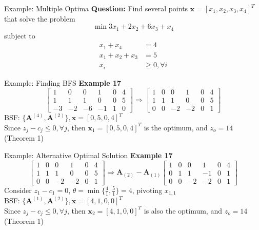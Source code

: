 \documentclass[aspectratio=169,hyperref,UTF8,CJK]{beamer}
\begin{document}
\begin{frame}{Example: Multiple Optima}
\textbf{Question:} Find several points \(\mathbf{x} = [x_1, x_2, x_3, x_4]^T\) that solve the problem
\[
\min 3x_1 + 2x_2 + 6x_3 + x_4
\]
subject to
\begin{align*}
x_1 + x_4 &= 4 \\
x_1 + x_2 + x_3 &= 5 \\
x_i &\geq 0, \forall i
\end{align*}
\end{frame}

\begin{frame}{Example: Finding BFS}
\textbf{Example 17}
\[
\begin{bmatrix}
1 & 0 & 0 & 1 & 0 & 4 \\
1 & 1 & 1 & 0 & 0 & 5 \\
-3 & -2 & -6 & -1 & 1 & 0
\end{bmatrix}
\Rightarrow
\begin{bmatrix}
1 & 0 & 0 & 1 & 0 & 4 \\
1 & 1 & 1 & 0 & 0 & 5 \\
0 & 0 & -2 & -2 & 0 & 1
\end{bmatrix}
\]
BSF: \(\{\mathbf{A}^{(4)}, \mathbf{A}^{(2)}\}, \mathbf{x} = [0, 5, 0, 4]^T\) \\
Since \(z_j - c_j \leq 0, \forall j\), then \(\mathbf{x}_1 = [0, 5, 0, 4]^T\) is the optimum, and \(z_o = 14\) (Theorem 1)
\end{frame}

\begin{frame}{Example: Alternative Optimal Solution}
\textbf{Example 17}
\[
\begin{bmatrix}
1 & 0 & 0 & 1 & 0 & 4 \\
1 & 1 & 1 & 0 & 0 & 5 \\
0 & 0 & -2 & -2 & 0 & 1
\end{bmatrix}
\Rightarrow
\mathbf{A}_{(2)} - \mathbf{A}_{(1)}
\begin{bmatrix}
1 & 0 & 0 & 1 & 0 & 4 \\
0 & 1 & 1 & -1 & 0 & 1 \\
0 & 0 & -2 & -2 & 0 & 1
\end{bmatrix}
\]
Consider \(z_1 - c_1 = 0\), \(\theta = \min\{\frac{4}{1}, \frac{5}{1}\} = 4\), pivoting \(x_{1,1}\) \\
BSF: \(\{\mathbf{A}^{(1)}, \mathbf{A}^{(2)}\}, \mathbf{x} = [4, 1, 0, 0]^T\) \\
Since \(z_j - c_j \le 0, \forall j\), then \(\mathbf{x}_2 = [4, 1, 0, 0]^T\) is also the optimum, and \(z_o = 14\) (Theorem 1)
\end{frame}
\end{document}
